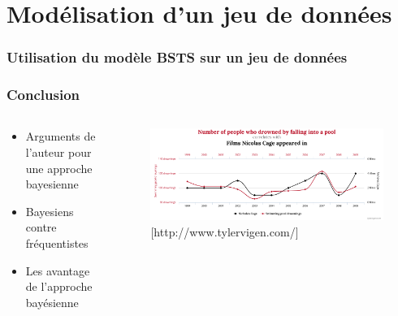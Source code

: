 \documentclass{presentation_template}
\begin{document}
%
\section{Modélisation d'un jeu de données}

\begin{frame}
  \frametitle{Utilisation du modèle BSTS sur un jeu de données}

  

\end{frame}

























\begin{frame}
    \normalsize
    \frametitle{Conclusion}
    \begin{columns}
      \begin{column}{0.5\textwidth}
      
        \begin{itemize}
      
        
          \item Arguments de l'auteur pour une approche bayesienne
          

          \vspace{1cm}
          \item Bayesiens contre fréquentistes
          \vspace{1cm}
          \item Les avantage de l'approche bayésienne
        \end{itemize}

      \end{column}
      \begin{column}{0.5\textwidth}
        \begin{figure}
          \includegraphics[width=\textwidth]{Figures/spurious.png}
          \caption{[http://www.tylervigen.com/]}
      \end{figure}
      \end{column}
      \end{columns}
\end{frame}
\end{document}
